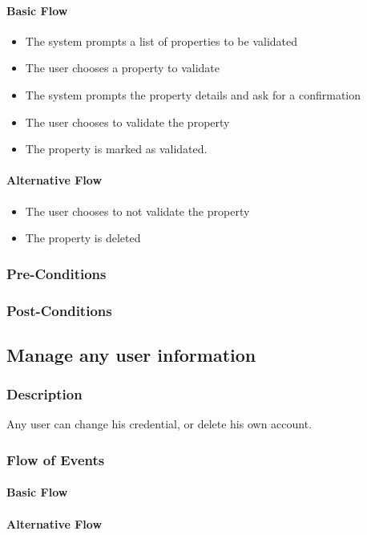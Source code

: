 \documentclass[a4paper,12pt]{article}
\begin{document}
\paragraph{Basic Flow}
\begin{itemize}
\item The system prompts a list of properties to be validated
\item The user chooses a property to validate
\item The system prompts the property details and ask for a confirmation
\item The user chooses to validate the property
\item The property is marked as validated.
\end{itemize}
\paragraph{Alternative Flow}
\begin{itemize}
\item The user chooses to not validate the property
\item The property is deleted
\end{itemize}
\subsubsection{Pre-Conditions}
\subsubsection{Post-Conditions}

\subsection{Manage any user information}
\subsubsection{Description}
Any user can change his credential, or delete his own account.
\subsubsection{Flow of Events}
\paragraph{Basic Flow}
\begin{itemize}
\end{itemize}
\paragraph{Alternative Flow}
\begin{itemize}
\end{itemize}
\end{document}
